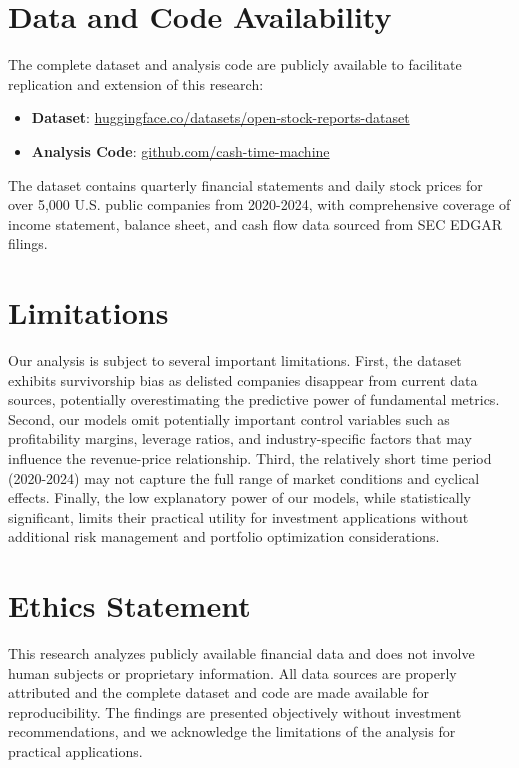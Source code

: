 \documentclass[11pt]{article}
\begin{document}
\section*{Data and Code Availability}

The complete dataset and analysis code are publicly available to facilitate replication and extension of this research:

\begin{itemize}
\item \textbf{Dataset}: \href{https://huggingface.co/datasets/almogtavor/open-stock-reports-dataset}{huggingface.co/datasets/open-stock-reports-dataset}
\item \textbf{Analysis Code}: \href{https://github.com/almogtavor/cash-time-machine}{github.com/cash-time-machine}
\end{itemize}

The dataset contains quarterly financial statements and daily stock prices for over 5,000 U.S. public companies from 2020-2024, with comprehensive coverage of income statement, balance sheet, and cash flow data sourced from SEC EDGAR filings.

\section*{Limitations}

Our analysis is subject to several important limitations. First, the dataset exhibits survivorship bias as delisted companies disappear from current data sources, potentially overestimating the predictive power of fundamental metrics. Second, our models omit potentially important control variables such as profitability margins, leverage ratios, and industry-specific factors that may influence the revenue-price relationship. Third, the relatively short time period (2020-2024) may not capture the full range of market conditions and cyclical effects. Finally, the low explanatory power of our models, while statistically significant, limits their practical utility for investment applications without additional risk management and portfolio optimization considerations.

\section*{Ethics Statement}

This research analyzes publicly available financial data and does not involve human subjects or proprietary information. All data sources are properly attributed and the complete dataset and code are made available for reproducibility. The findings are presented objectively without investment recommendations, and we acknowledge the limitations of the analysis for practical applications.
\end{document}
